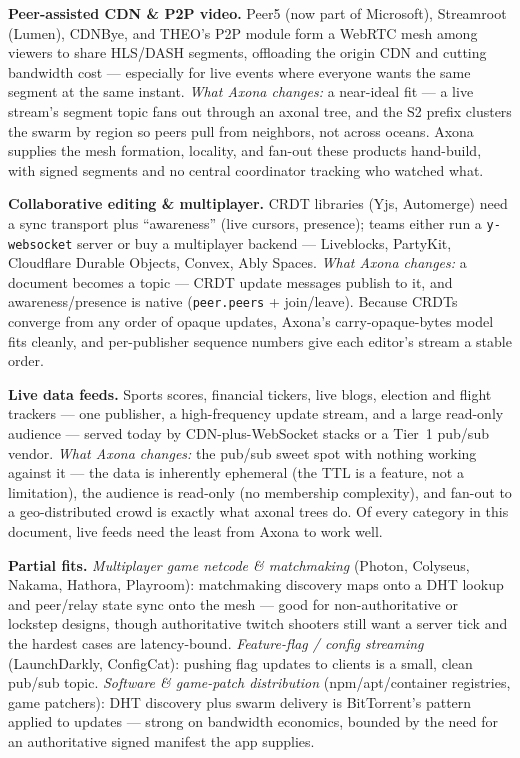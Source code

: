 \documentclass[nobib]{tufte-handout}
\begin{document}
\textbf{Peer-assisted CDN \& P2P video.} Peer5 (now part of Microsoft),
Streamroot (Lumen), CDNBye, and THEO's P2P module form a WebRTC mesh
among viewers to share HLS/DASH segments, offloading the origin CDN and
cutting bandwidth cost --- especially for live events where everyone
wants the same segment at the same instant. \emph{What Axona changes:} a
near-ideal fit --- a live stream's segment topic fans out through an
axonal tree, and the S2 prefix clusters the swarm by region so peers
pull from neighbors, not across oceans. Axona supplies the mesh
formation, locality, and fan-out these products hand-build, with signed
segments and no central coordinator tracking who watched what.

\textbf{Collaborative editing \& multiplayer.} CRDT libraries (Yjs,
Automerge) need a sync transport plus ``awareness'' (live cursors,
presence); teams either run a \texttt{y-websocket} server or buy a
multiplayer backend --- Liveblocks, PartyKit, Cloudflare Durable
Objects, Convex, Ably Spaces. \emph{What Axona changes:} a document
becomes a topic --- CRDT update messages publish to it, and
awareness/presence is native (\texttt{peer.peers} + join/leave). Because
CRDTs converge from any order of opaque updates, Axona's
carry-opaque-bytes model fits cleanly, and per-publisher sequence
numbers give each editor's stream a stable order.

\textbf{Live data feeds.} Sports scores, financial tickers, live blogs,
election and flight trackers --- one publisher, a high-frequency update
stream, and a large read-only audience --- served today by
CDN-plus-WebSocket stacks or a Tier~1 pub/sub vendor. \emph{What Axona
changes:} the pub/sub sweet spot with nothing working against it --- the
data is inherently ephemeral (the TTL is a feature, not a limitation),
the audience is read-only (no membership complexity), and fan-out to a
geo-distributed crowd is exactly what axonal trees do. Of every category
in this document, live feeds need the least from Axona to work well.

\textbf{Partial fits.} \emph{Multiplayer game netcode \& matchmaking}
(Photon, Colyseus, Nakama, Hathora, Playroom): matchmaking discovery
maps onto a DHT lookup and peer/relay state sync onto the mesh --- good
for non-authoritative or lockstep designs, though authoritative twitch
shooters still want a server tick and the hardest cases are
latency-bound. \emph{Feature-flag / config streaming} (LaunchDarkly,
ConfigCat): pushing flag updates to clients is a small, clean pub/sub
topic. \emph{Software \& game-patch distribution} (npm/apt/container
registries, game patchers): DHT discovery plus swarm delivery is
BitTorrent's pattern applied to updates --- strong on bandwidth
economics, bounded by the need for an authoritative signed manifest the
app supplies.
\end{document}
